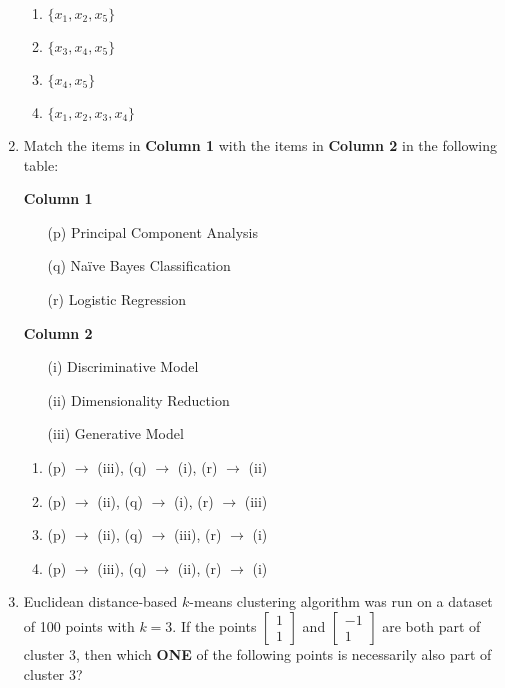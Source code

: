\documentclass[journal,12pt,onecolumn]{IEEEtran}
\theoremstyle{remark}
\begin{document}
\begin{enumerate}
\begin{enumerate}
    \item $ \{ x_1, x_2, x_5 \} $
    \item $ \{ x_3, x_4, x_5 \} $
    \item $ \{ x_4, x_5 \} $
    \item $ \{ x_1, x_2, x_3, x_4 \} $
\end{enumerate}

\item Match the items in \textbf{Column 1} with the items in \textbf{Column 2} in the following table:

\begin{multicols}{2}
\textbf{Column 1}
\begin{enumerate}
    \item[(p)] Principal Component Analysis
    \item[(q)] Naïve Bayes Classification
    \item[(r)] Logistic Regression
\end{enumerate}

\columnbreak

\textbf{Column 2}
\begin{enumerate}
    \item[(i)] Discriminative Model
    \item[(ii)] Dimensionality Reduction
    \item[(iii)] Generative Model
\end{enumerate}
\end{multicols}

\begin{enumerate}
    \item (p) $ \rightarrow $ (iii), (q) $ \rightarrow $ (i), (r) $ \rightarrow $ (ii)
    \item (p) $ \rightarrow $ (ii), (q) $ \rightarrow $ (i), (r) $ \rightarrow $ (iii)
    \item (p) $ \rightarrow $ (ii), (q) $ \rightarrow $ (iii), (r) $ \rightarrow $ (i)
    \item (p) $ \rightarrow $ (iii), (q) $ \rightarrow $ (ii), (r) $ \rightarrow $ (i)
\end{enumerate}

\item Euclidean distance-based $ k $-means clustering algorithm was run on a dataset of 100 points with $ k = 3 $. If the points $ \begin{bmatrix} 1 \\ 1 \end{bmatrix} $ and $ \begin{bmatrix} -1 \\ 1 \end{bmatrix} $ are both part of cluster 3, then which \textbf{ONE} of the following points is necessarily also part of cluster 3?


\end{enumerate}
\end{document}
